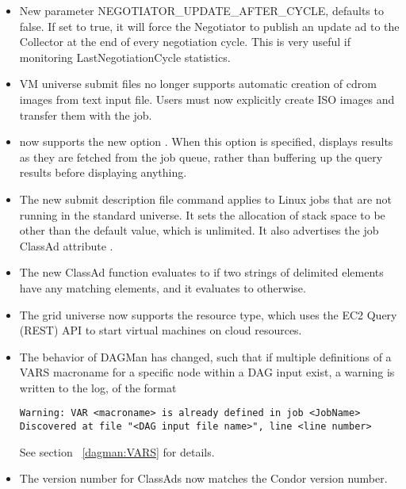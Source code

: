 \begin{itemize}
\item New parameter NEGOTIATOR\_UPDATE\_AFTER\_CYCLE, defaults 
to false.  If set to true, it will force the Negotiator to publish an update ad to the Collector at the end of every negotiation cycle. This is very useful
    if monitoring LastNegotiationCycle statistics.

\item VM universe submit files no longer supports
automatic creation of cdrom images from text input file.
Users must now explicitly create ISO images and transfer them
with the job.

\item {} now supports the new option .
  When this option is specified,  displays results as they
  are fetched from the job queue, rather than buffering up the query
  results before displaying anything.

\item The new submit description file command  
  applies to Linux jobs that are not running in the standard universe. 
  It sets the allocation of stack space to be other than the default
  value, which is unlimited.
  It also advertises the job ClassAd attribute .

\item The new ClassAd function  evaluates to 
   if two strings of delimited elements have any matching elements,
  and it evaluates to  otherwise.

\item The grid universe now supports the  resource type,
  which uses the EC2 Query (REST) API to start virtual machines on cloud
  resources.

\item The behavior of DAGMan has changed, 
such that if multiple definitions of a VARS macroname 
for a specific node within a DAG input exist,
a warning is written to the log, of the format
\begin{verbatim}
Warning: VAR <macroname> is already defined in job <JobName>
Discovered at file "<DAG input file name>", line <line number>
\end{verbatim}
See section ~\ref{dagman:VARS} for details.

\item The version number for ClassAds now matches the Condor version number. 


\end{itemize}
